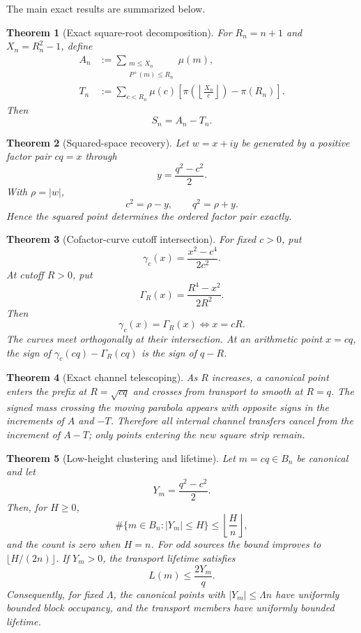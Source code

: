 \documentclass[11pt]{article}
\newtheorem{theorem}{Theorem}[section]
\theoremstyle{definition}
\newcommand{\Pplus}{P^{+}}
\newcommand{\1}{\mathbf{1}}
\begin{document}
The main exact results are summarized below.

\begin{theorem}[Exact square-root decomposition]
\label{thm:intro-decomposition}
For $R_n=n+1$ and $X_n=R_n^2-1$, define
\begin{align*}
 A_n&:=\sum_{\substack{m\le X_n\\\Pplus(m)\le R_n}}\mu(m),\\
 T_n&:=\sum_{c<R_n}\mu(c)
 \left[
 \pi\!\left(\left\lfloor\frac{X_n}{c}\right\rfloor\right)-\pi(R_n)
 \right].
\end{align*}
Then
\[
 \boxed{S_n=A_n-T_n.}
\]
\end{theorem}

\begin{theorem}[Squared-space recovery]
\label{thm:intro-recovery}
Let $w=x+iy$ be generated by a positive factor pair $cq=x$ through
\[
 y=\frac{q^2-c^2}{2}.
\]
With $\rho=|w|$,
\[
 \boxed{c^2=\rho-y,\qquad q^2=\rho+y.}
\]
Hence the squared point determines the ordered factor pair exactly.
\end{theorem}

\begin{theorem}[Cofactor-curve cutoff intersection]
\label{thm:intro-intersection}
For fixed $c>0$, put
\[
 \gamma_c(x)=\frac{x^2-c^4}{2c^2}.
\]
At cutoff $R>0$, put
\[
 \Gamma_R(x)=\frac{R^4-x^2}{2R^2}.
\]
Then
\[
 \boxed{\gamma_c(x)=\Gamma_R(x)\iff x=cR.}
\]
The curves meet orthogonally at their intersection.  At an arithmetic point $x=cq$, the sign of $\gamma_c(cq)-\Gamma_R(cq)$ is the sign of $q-R$.
\end{theorem}

\begin{theorem}[Exact channel telescoping]
\label{thm:intro-telescoping}
As $R$ increases, a canonical point enters the prefix at $R=\sqrt{cq}$ and crosses from transport to smooth at $R=q$.  The signed mass crossing the moving parabola appears with opposite signs in the increments of $A$ and $-T$.  Therefore all internal channel transfers cancel from the increment of $A-T$; only points entering the new square strip remain.
\end{theorem}

\begin{theorem}[Low-height clustering and lifetime]
\label{thm:intro-low}
Let $m=cq\in B_n$ be canonical and let
\[
 Y_m=\frac{q^2-c^2}{2}.
\]
Then, for $H\ge0$,
\[
 \#\{m\in B_n:|Y_m|\le H\}
 \le\left\lfloor\frac{H}{n}\right\rfloor,
\]
and the count is zero when $H=n$.  For odd sources the bound improves to
$\lfloor H/(2n)\rfloor$.
If $Y_m>0$, the transport lifetime satisfies
\[
 L(m)\le\frac{2Y_m}{q}.
\]
Consequently, for fixed $\Lambda$, the canonical points with $|Y_m|\le\Lambda n$ have uniformly bounded block occupancy, and the transport members have uniformly bounded lifetime.
\end{theorem}
\end{document}
